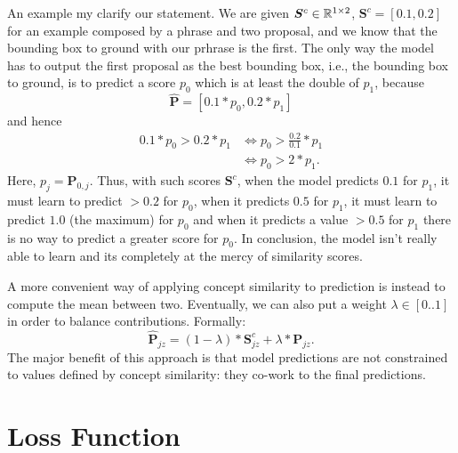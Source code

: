 An example my clarify our statement. We are given $\bm{S}^c \in
\mathbb{R}^{1 \times 2}$, $\bm{S}^c = [0.1, 0.2]$ for an example composed by a
phrase and two proposal, and we know that the bounding box to ground
with our prhrase is the first. The only way the model has to output
the first proposal as the best bounding box, i.e., the bounding box to
ground, is to predict a score $p_{0}$ which is at least the double of
$p_{1}$, because
\begin{equation}
  \bm{\hat{P}} = [0.1 * p_{0}, 0.2 * p_{1}]
\end{equation}
and hence
\begin{equation}
\begin{split}
0.1 * p_{0} > 0.2 * p_{1} & \iff p_{0} >  \frac{0.2}{0.1} * p_{1} \\
  & \iff p_{0} > 2 * p_{1}.
\end{split}
\end{equation}
Here, $p_{j} = \bm{P}_{0,j}$. Thus, with such scores $\bm{S}^c$, when
the model predicts $0.1$ for $p_1$, it must learn to predict $> 0.2$
for $p_0$, when it predicts $0.5$ for $p_1$, it must learn to predict
$1.0$ (the maximum) for $p_0$ and when it predicts a value $> 0.5$ for
$p_1$ there is no way to predict a greater score for $p_0$. In
conclusion, the model isn't really able to learn and its completely at
the mercy of similarity scores.

A more convenient way of applying concept similarity to prediction is
instead to compute the mean between two. Eventually, we can also put a
weight $\lambda \in [0 .. 1]$ in order to balance
contributions. Formally:
\begin{equation}
  \bm{\hat{P}}_{jz} = (1 - \lambda) * \bm{S}^c_{jz} + \lambda * \bm{P}_{jz}.
\end{equation}
The major benefit of this approach is that model predictions are not
constrained to values defined by concept similarity: they co-work to
the final predictions.

\section{Loss Function}

